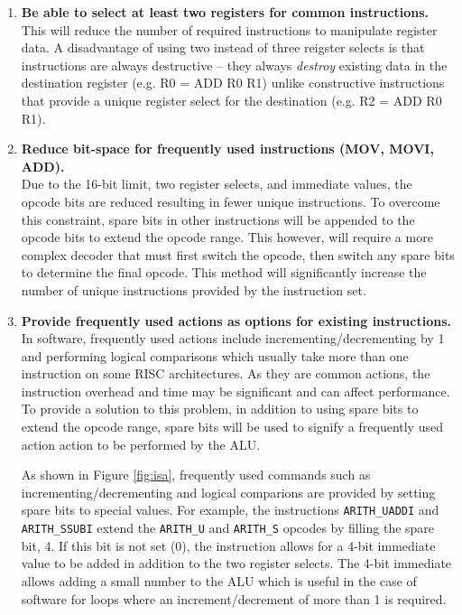 \documentclass[11pt,a4paper]{report}
\begin{document}
{\begin{enumerate}[leftmargin=3\parindent, label=\bfseries ISA\arabic*, style=nextline]
\item{\textbf{Be able to select at least two registers for common instructions.}\\
This will reduce the number of required instructions to manipulate register data. A disadvantage of using two instead of three reigster selects is that instructions are always destructive -- they always \textit{destroy} existing data in the destination register (e.g. R0 = ADD R0 R1) unlike constructive instructions that provide a unique register select for the destination (e.g. R2 = ADD R0 R1). }\label{isa:regs}

\item{\textbf{Reduce bit-space for frequently used instructions (MOV, MOVI, ADD).}\\
Due to the 16-bit limit, two register selects, and immediate values, the opcode bits are reduced resulting in fewer unique instructions. To overcome this constraint, spare bits in other instructions will be appended to the opcode bits to extend the opcode range. This however, will require a more complex decoder that must first switch the opcode, then switch any spare bits to determine the final opcode. This method will significantly increase the number of unique instructions provided by the instruction set.}\label{isa:bits}

\item{\textbf{Provide frequently used actions as options for existing instructions.}\\
In software, frequently used actions include incrementing/decrementing by 1 and performing logical comparisons which usually take more than one instruction on some RISC architectures. As they are common actions, the instruction overhead and time may be significant and can affect performance. To provide a solution to this problem, in addition to using spare bits to extend the opcode range, spare bits will be used to signify a frequently used action action to be performed by the ALU.

As shown in Figure \ref{fig:isa}, frequently used commands such as incrementing/decrementing and logical comparions are provided by setting spare bits to special values. For example, the instructions \verb|ARITH_UADDI| and \verb|ARITH_SSUBI| extend the \verb|ARITH_U| and \verb|ARITH_S| opcodes by filling the spare bit, 4. If this bit is not set (0), the instruction allows for a 4-bit immediate value to be added in addition to the two register selects. The 4-bit immediate allows adding a small number to the ALU which is useful in the case of software for loops where an increment/decrement of more than 1 is required.

}
\end{enumerate}}
\end{document}

